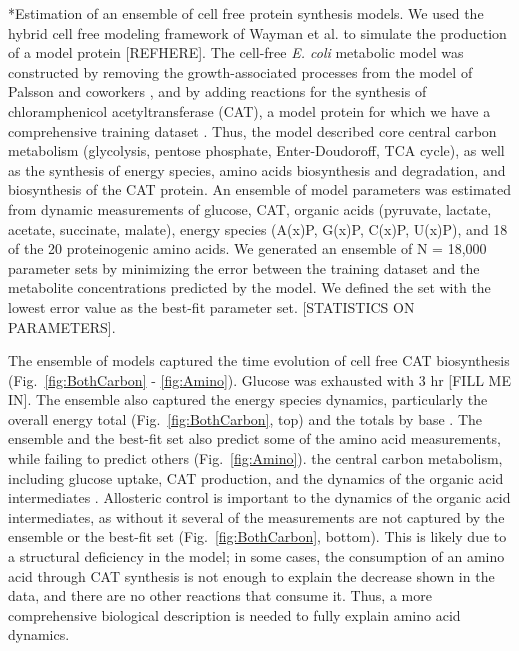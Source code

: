 \documentclass[12pt]{article}
\makeatletter
\renewcommand\subsection{\@startsection
	{subsection}{2}{0mm}
	{-0.05in}
	{-0.5\baselineskip}
	{\normalfont\normalsize\bfseries}}
\makeatother
\begin{document}
\subsection*{Estimation of an ensemble of cell free protein synthesis models.}
We used the hybrid cell free modeling framework of Wayman et al. to simulate the production of a model protein [REFHERE].
The cell-free \textit{E. coli} metabolic model was constructed by removing the growth-associated processes from the model of Palsson and coworkers \cite{2000_edwards_palsson_PNAS}, and by adding reactions for the synthesis of chloramphenicol acetyltransferase (CAT), a model protein for which we have a comprehensive training dataset \cite{2005_calhoun_BiotechnologyProgress}.
Thus, the model described core central carbon metabolism (glycolysis, pentose phosphate, Enter-Doudoroff, TCA cycle),
as well as the synthesis of energy species, amino acids biosynthesis and degradation, and biosynthesis of the CAT protein.
An ensemble of model parameters was estimated from dynamic measurements of glucose, CAT, organic acids (pyruvate, lactate, acetate, succinate, malate), energy species (A(x)P, G(x)P, C(x)P, U(x)P), and 18 of the 20 proteinogenic amino acids. We generated an ensemble of N = 18,000 parameter sets by minimizing the error between the training dataset and the metabolite concentrations predicted by the model. We defined the set with the lowest error value as the best-fit parameter set. [STATISTICS ON PARAMETERS].

The ensemble of models captured the time evolution of cell free CAT biosynthesis (Fig.~\ref{fig:BothCarbon} - \ref{fig:Amino}).
Glucose was exhausted with 3 hr [FILL ME IN].
The ensemble also captured the energy species dynamics, particularly the overall energy total (Fig.~\ref{fig:BothCarbon}, top) and the totals by base .
The ensemble and the best-fit set also predict some of the amino acid measurements, while failing to predict others (Fig.~\ref{fig:Amino}).
the central carbon metabolism, including glucose uptake, CAT production, and the dynamics of the organic acid intermediates .
Allosteric control is important to the dynamics of the organic acid intermediates, as without it several of the measurements are not captured by the ensemble or the best-fit set (Fig.~\ref{fig:BothCarbon}, bottom).
This is likely due to a structural deficiency in the model; in some cases, the consumption of an amino acid through CAT synthesis is not enough to explain the decrease shown in the data, and there are no other reactions that consume it. Thus, a more comprehensive biological description is needed to fully explain amino acid dynamics.
\end{document}
